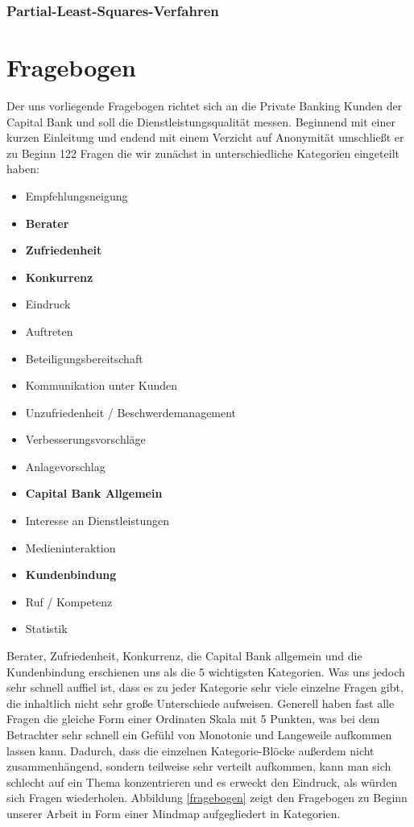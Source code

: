 \documentclass{article}\usepackage[]{graphicx}\usepackage[]{color}
\begin{document}
\subsubsection{Partial-Least-Squares-Verfahren}

\section{Fragebogen}
Der uns vorliegende Fragebogen richtet sich an die Private Banking Kunden der Capital Bank und soll die Dienstleistungsqualität messen. 
Beginnend mit einer kurzen Einleitung und endend mit einem Verzicht auf Anonymität umschließt er zu Beginn 122 Fragen die wir zunächst in unterschiedliche Kategorien eingeteilt haben:
\begin{itemize}
\item Empfehlungsneigung
\item \textbf{Berater}
\item \textbf{Zufriedenheit}
\item \textbf{Konkurrenz}
\item Eindruck
\item Auftreten
\item Beteiligungsbereitschaft
\item Kommunikation unter Kunden
\item Unzufriedenheit / Beschwerdemanagement
\item Verbesserungsvorschläge
\item Anlagevorschlag
\item \textbf{Capital Bank Allgemein}
\item Interesse an Dienstleistungen
\item Medieninteraktion
\item \textbf{Kundenbindung}
\item Ruf / Kompetenz
\item Statistik
\end{itemize}
Berater, Zufriedenheit, Konkurrenz, die Capital Bank allgemein und die Kundenbindung erschienen uns als die 5 wichtigsten Kategorien. Was uns jedoch sehr schnell auffiel ist, dass es zu jeder Kategorie sehr viele einzelne Fragen gibt, die inhaltlich nicht sehr große Unterschiede aufweisen. Generell haben fast alle Fragen die gleiche Form einer Ordinaten Skala mit 5 Punkten, was bei dem Betrachter sehr schnell ein Gefühl von Monotonie und Langeweile aufkommen lassen kann. Dadurch, dass die einzelnen Kategorie-Blöcke außerdem nicht zusammenhängend, sondern teilweise sehr verteilt aufkommen, kann man sich schlecht auf ein Thema konzentrieren und es erweckt den Eindruck, als würden sich Fragen wiederholen. Abbildung \ref{fragebogen} zeigt den Fragebogen zu Beginn unserer Arbeit in Form einer Mindmap aufgegliedert in Kategorien.\\
\end{document}
